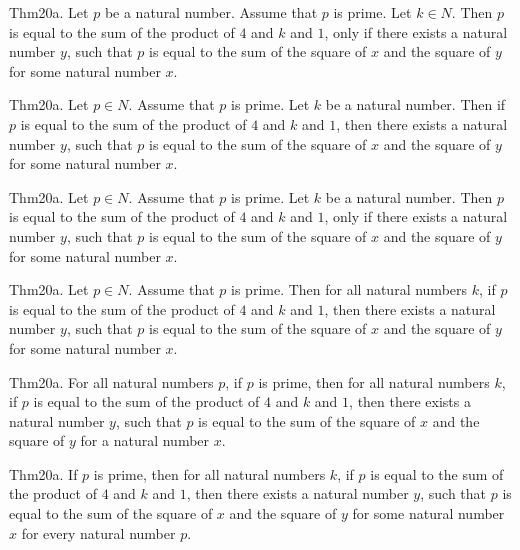 \documentclass{article}
\begin{document}
Thm20a. Let $p$ be a natural number. Assume that $p$ is prime. Let $k \in N$. Then $p$ is equal to the sum of the product of $4$ and $k$ and $1$, only if there exists a natural number $y$, such that $p$ is equal to the sum of the square of $x$ and the square of $y$ for some natural number $x$.

Thm20a. Let $p \in N$. Assume that $p$ is prime. Let $k$ be a natural number. Then if $p$ is equal to the sum of the product of $4$ and $k$ and $1$, then there exists a natural number $y$, such that $p$ is equal to the sum of the square of $x$ and the square of $y$ for some natural number $x$.

Thm20a. Let $p \in N$. Assume that $p$ is prime. Let $k$ be a natural number. Then $p$ is equal to the sum of the product of $4$ and $k$ and $1$, only if there exists a natural number $y$, such that $p$ is equal to the sum of the square of $x$ and the square of $y$ for some natural number $x$.

Thm20a. Let $p \in N$. Assume that $p$ is prime. Then for all natural numbers $k$, if $p$ is equal to the sum of the product of $4$ and $k$ and $1$, then there exists a natural number $y$, such that $p$ is equal to the sum of the square of $x$ and the square of $y$ for some natural number $x$.

Thm20a. For all natural numbers $p$, if $p$ is prime, then for all natural numbers $k$, if $p$ is equal to the sum of the product of $4$ and $k$ and $1$, then there exists a natural number $y$, such that $p$ is equal to the sum of the square of $x$ and the square of $y$ for a natural number $x$.

Thm20a. If $p$ is prime, then for all natural numbers $k$, if $p$ is equal to the sum of the product of $4$ and $k$ and $1$, then there exists a natural number $y$, such that $p$ is equal to the sum of the square of $x$ and the square of $y$ for some natural number $x$ for every natural number $p$.
\end{document}
